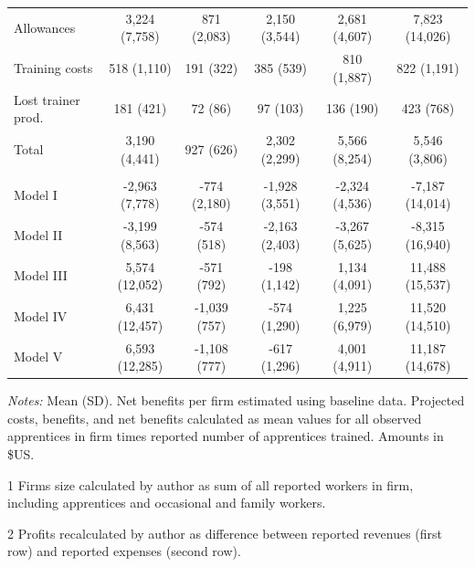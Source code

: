 \documentclass[
  a4paper, twoside, 12pt]{book}
\begin{document}
\begin{table}[H]
{\begin{threeparttable}
\begin{tabular}[t]{lccccc}
\hspace{1em}Allowances & 3,224 (7,758) & 871 (2,083) & 2,150 (3,544) & 2,681 (4,607) & 7,823 (14,026)\\
\hspace{1em}Training costs & 518 (1,110) & 191 (322) & 385 (539) & 810 (1,887) & 822 (1,191)\\
\hspace{1em}Lost trainer prod. & 181 (421) & 72 (86) & 97 (103) & 136 (190) & 423 (768)\\
\hspace{1em}Total & 3,190 (4,441) & 927 (626) & 2,302 (2,299) & 5,566 (8,254) & 5,546 (3,806)\\
\addlinespace[0.3em]
\multicolumn{6}{l}{\textbf{Net benefits}}\\
\hspace{1em}Model I & -2,963 (7,778) & -774 (2,180) & -1,928 (3,551) & -2,324 (4,536) & -7,187 (14,014)\\
\hspace{1em}Model II & -3,199 (8,563) & -574 (518) & -2,163 (2,403) & -3,267 (5,625) & -8,315 (16,940)\\
\hspace{1em}Model III & 5,574 (12,052) & -571 (792) & -198 (1,142) & 1,134 (4,091) & 11,488 (15,537)\\
\hspace{1em}Model IV & 6,431 (12,457) & -1,039 (757) & -574 (1,290) & 1,225 (6,979) & 11,520 (14,510)\\
\hspace{1em}Model V & 6,593 (12,285) & -1,108 (777) & -617 (1,296) & 4,001 (4,911) & 11,187 (14,678)\\
\bottomrule
\end{tabular}
\begin{tablenotes}
\small
\item \textit{Notes:} Mean (SD). Net benefits per firm estimated using baseline data. 
Projected costs, benefits, and net benefits calculated as mean values for all observed apprentices in 
firm times reported number of apprentices trained. Amounts in \$US.
\item[1] Firms size calculated by author as sum of all reported workers in firm, including apprentices and occasional and family workers.
\item[2] Profits recalculated by author as difference between reported revenues (first row) and reported expenses (second row).
\end{tablenotes}
\end{threeparttable}}
\end{table}
\end{document}
